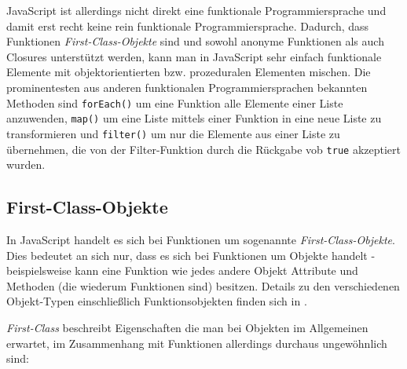 \begin{description}
JavaScript ist allerdings nicht direkt eine funktionale Programmiersprache und damit erst recht
keine rein funktionale Programmiersprache. Dadurch, dass Funktionen \emph{First-Class-Objekte} sind
und sowohl anonyme Funktionen als auch Closures unterstützt werden, kann man in JavaScript sehr
einfach funktionale Elemente mit objektorientierten bzw. prozeduralen Elementen mischen. Die
prominentesten aus anderen funktionalen Programmiersprachen bekannten Methoden sind
\lstinline{forEach()} um eine Funktion alle Elemente einer Liste anzuwenden, \lstinline{map()} um
eine Liste mittels einer Funktion in eine neue Liste zu transformieren und \lstinline{filter()} um
nur die Elemente aus einer Liste zu übernehmen, die von der Filter-Funktion durch die Rückgabe vob
\lstinline{true} akzeptiert wurden.
\end{description}


\subsection{First-Class-Objekte}
In JavaScript handelt es sich bei Funktionen um sogenannte \emph{First-Class-Objekte}. Dies
bedeutet an sich nur, dass es sich bei Funktionen um Objekte handelt - beispielsweise kann eine
Funktion wie jedes andere Objekt Attribute und Methoden (die wiederum Funktionen sind) besitzen.
Details zu den verschiedenen Objekt-Typen einschließlich Funktionsobjekten finden sich in
\citep[Kap. 8.6]{ecmascript}.

\emph{First-Class} beschreibt Eigenschaften die man bei Objekten im Allgemeinen erwartet, im
Zusammenhang mit Funktionen allerdings durchaus ungewöhnlich sind:

